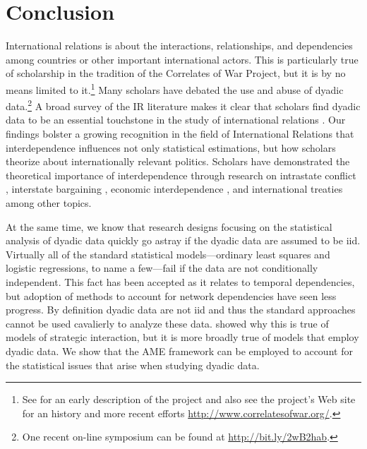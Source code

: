 \section{\textbf{Conclusion}}

International relations is about the interactions, relationships, and dependencies among countries or other important international actors. This is particularly true of scholarship in the tradition of the Correlates of War Project, but it is by no means limited to it.\footnote{See \cite{singer:1972} for an early description of the project and also see the project's Web site for an history and more recent efforts \url{http://www.correlatesofwar.org/}.} Many scholars have debated the use and abuse of dyadic data.\footnote{One recent on-line symposium can be found at \url{http://bit.ly/2wB2hab}.} A broad survey of the IR literature makes it clear that scholars find dyadic data to be an essential touchstone in the study of international relations \citep{erikson:pinto:2014,aronow:etal:2015}. Our findings bolster a growing recognition in the field of International Relations that interdependence influences not only statistical estimations, but how scholars theorize about internationally relevant politics. Scholars have demonstrated the theoretical importance of interdependence through research on intrastate conflict \citep{dorff:etal:2020}, interstate bargaining \citep{gallop:2017}, economic interdependence \citep{maoz:2009a}, and international treaties \citep{kinne:2013} among other topics.

At the same time, we know that research designs focusing on the statistical analysis of dyadic data quickly go astray if the dyadic data are assumed to be iid.  Virtually all of the standard statistical models---ordinary least squares and logistic regressions, to name a few---fail if the data are not conditionally independent. This fact has been accepted as it relates to temporal dependencies, but adoption of methods to account for network dependencies have seen less progress. By definition dyadic data are not iid and thus the standard approaches cannot be used cavalierly to analyze these data. \citet{signorino:1999} showed why this is true of models of strategic interaction, but it is more broadly true of models that employ dyadic data.  We show that the AME framework can be employed to account for the statistical issues that arise when studying dyadic data.

